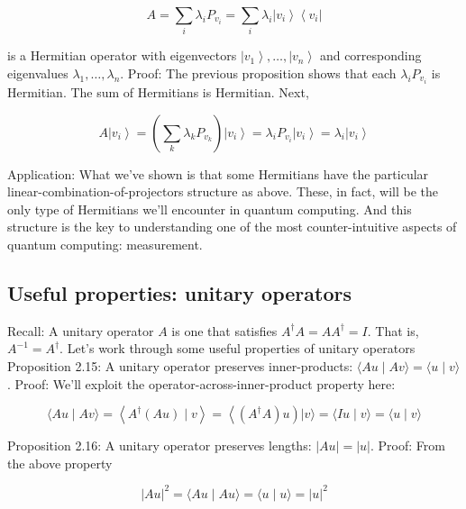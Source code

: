 \documentclass[main.tex]{subfiles}
\begin{document}
    $$
    A=\sum_{i} \lambda_{i} P_{v_{i}}=\sum_{i} \lambda_{i}\left|v_{i}\right\rangle\left\langle v_{i}\right|
    $$
    
    is a Hermitian operator with eigenvectors $\left|v_{1}\right\rangle, \ldots,\left|v_{n}\right\rangle$ and corresponding eigenvalues $\lambda_{1}, \ldots, \lambda_{n}$. Proof: The previous proposition shows that each $\lambda_{i} P_{v_{i}}$ is Hermitian. The sum of Hermitians is Hermitian. Next,
    
    $$
    A\left|v_{i}\right\rangle=\left(\sum_{k} \lambda_{k} P_{v_{k}}\right)\left|v_{i}\right\rangle=\lambda_{i} P_{v_{i}}\left|v_{i}\right\rangle=\lambda_{i}\left|v_{i}\right\rangle
    $$
    
    Application: What we've shown is that some Hermitians have the particular linear-combination-of-projectors structure as above. These, in fact, will be the only type of Hermitians we'll encounter in quantum computing. And this structure is the key to understanding one of the most counter-intuitive aspects of quantum computing: measurement.

\subsection{Useful properties: unitary operators}

    Recall: A unitary operator $A$ is one that satisfies $A^{\dagger} A=A A^{\dagger}=I$. That is, $A^{-1}=A^{\dagger}$. Let's work through some useful properties of unitary operators Proposition 2.15: A unitary operator preserves inner-products: $\langle A u \mid A v\rangle=\langle u \mid v\rangle$. Proof: We'll exploit the operator-across-inner-product property here:
    
    $$
    \langle A u \mid A v\rangle=\left\langle A^{\dagger}(A u) \mid v\right\rangle=\left\langle\left(A^{\dagger} A\right) u\right)|v\rangle=\langle I u \mid v\rangle=\langle u \mid v\rangle
    $$
    
    Proposition 2.16: A unitary operator preserves lengths: $|A u|=|u|$. Proof: From the above property
    
    $$
    |A u|^{2}=\langle A u \mid A u\rangle=\langle u \mid u\rangle=|u|^{2}
    $$
    
\end{document}

